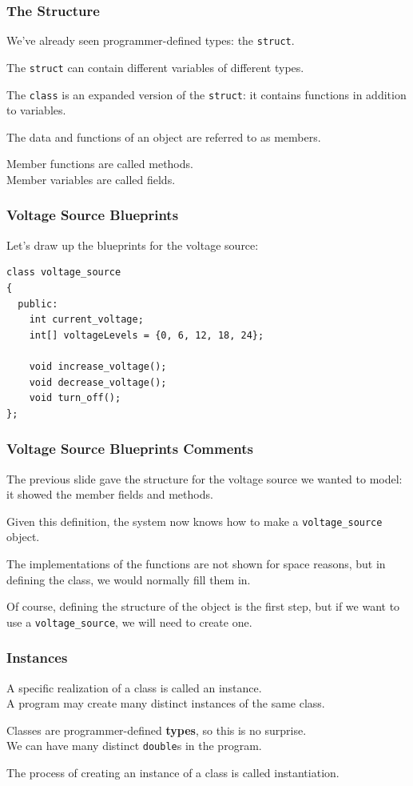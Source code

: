 \begin{frame}
\frametitle{The Structure}

We've already seen programmer-defined types: the \texttt{struct}.

The \texttt{struct} can contain different variables of different types.

The \texttt{class} is an expanded version of the \texttt{struct}: it contains functions in addition to variables.

The data and functions of an object are referred to as \alert{members}.

Member functions are called \alert{methods}.\\
Member variables are called \alert{fields}.

\end{frame}


\begin{frame}[fragile]
\frametitle{Voltage Source Blueprints}

Let's draw up the blueprints for the voltage source:
{\scriptsize
\begin{verbatim}
class voltage_source
{
  public: 
    int current_voltage;
    int[] voltageLevels = {0, 6, 12, 18, 24};

    void increase_voltage();  
    void decrease_voltage();  
    void turn_off();
};
\end{verbatim}
}

\end{frame}

\begin{frame}
\frametitle{Voltage Source Blueprints Comments}

The previous slide gave the structure for the voltage source we wanted to model: it showed the member fields and methods.

Given this definition, the system now knows how to make a \texttt{voltage\_source} object.

The implementations of the functions are not shown for space reasons, but in defining the class, we would normally fill them in.

Of course, defining the structure of the object is the first step, but if we want to use a \texttt{voltage\_source}, we will need to create one.

\end{frame}


\begin{frame}
\frametitle{Instances}

A specific realization of a class is called an \alert{instance}.\\
\quad A program may create many distinct instances of the same class.

Classes are programmer-defined \textbf{types}, so this is no surprise.\\
\quad We can have many distinct \texttt{double}s in the program.

The process of creating an instance of a class is called \alert{instantiation}.


\end{frame}

